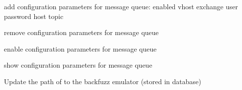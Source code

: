 \documentclass[letterpaper,10pt,english]{sphinxhowto}
\begin{document}
\begin{fulllineitems}
\label{COCOMA/02_how_to_use_it:cmdoption-ccmsh-q}
add configuration parameters for message queue:
enabled vhost exchange user password host topic

\end{fulllineitems}


\begin{fulllineitems}
\label{COCOMA/02_how_to_use_it:cmdoption-ccmsh-m}
remove configuration parameters for message queue

\end{fulllineitems}


\begin{fulllineitems}
\label{COCOMA/02_how_to_use_it:cmdoption-ccmsh-a}
enable configuration parameters for message queue

\end{fulllineitems}


\begin{fulllineitems}
\label{COCOMA/02_how_to_use_it:cmdoption-ccmsh-s}
show configuration parameters for message queue

\end{fulllineitems}


\begin{fulllineitems}
\label{COCOMA/02_how_to_use_it:cmdoption-ccmsh-b}
Update the path of to the backfuzz emulator (stored in database)

\end{fulllineitems}

\end{document}
